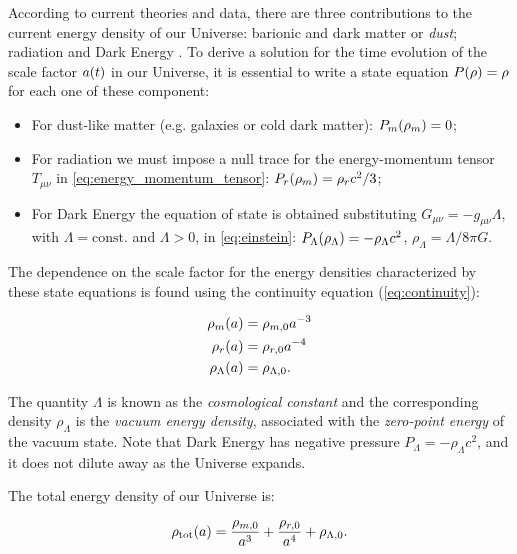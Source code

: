 According to current theories and data, there are three
contributions to the current energy density of our Universe:
barionic and dark matter or \emph{dust}; radiation and Dark Energy
\autocite{tong2019lectures}.
To derive a solution for the time evolution of the scale factor $a\qty(t)$
in our Universe, it is essential to write a state equation
$P\qty(\rho) = \rho$ for each one of these component:

\begin{itemize}
        \item For dust-like matter (e.g. galaxies or cold dark matter):
        $P_m\qty(\rho_m) = 0$;
        \item For radiation we must impose a null trace for the energy-momentum
        tensor $T_{\mu \nu}$ in \autoref{eq:energy_momentum_tensor}: $P_r\qty(\rho_m)
        = \rho_r c^2/3$;
        \item For Dark Energy the equation of state is obtained
        substituting  $G_{\mu \nu} = -g_{\mu \nu} \Lambda$, with $\Lambda =
        \text{const.}$ and $\Lambda > 0$, in \autoref{eq:einstein}:
        $P_\Lambda\qty(\rho_\Lambda) = -\rho_\Lambda c^2$, $\rho_\Lambda =
        \Lambda/8\pi G$.
\end{itemize}

The dependence on the scale factor for the energy densities characterized by
these state equations is found using the continuity equation
(\autoref{eq:continuity}):

\begin{align}
        \rho_m\qty(a) & = \rho_{m,0}a^{-3} \label{eq:rho_m} \\
        \rho_r\qty(a) & = \rho_{r,0}a^{-4} \label{eq:rho_r} \\
        \rho_\Lambda\qty(a) & = \rho_{\Lambda,0} \label{eq:rho_lambda}.
\end{align}

The quantity $\Lambda$ is known as the \emph{cosmological constant} and the
corresponding density $\rho_\Lambda$ is the \emph{vacuum energy density},
associated with the \emph{zero-point energy} of the vacuum state. Note that
Dark Energy has negative pressure $P_\Lambda = -\rho_\Lambda c^2$, and it
does not dilute away as the Universe expands.

The total energy density of our Universe is:

\begin{equation}
        \rho_\text{tot}\qty(a) = \frac{\rho_{m,0}}{a^3} + \frac{\rho_{r,0}}{a^4} +
        \rho_{\Lambda,0}.
\end{equation}

